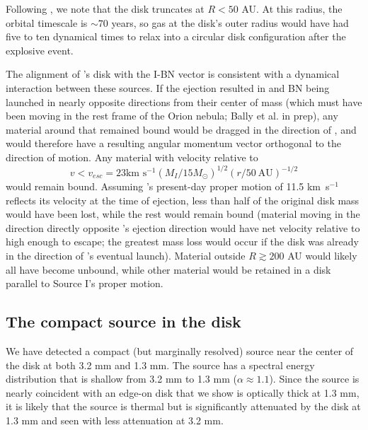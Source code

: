 \documentclass[twocolumn]{aastex61}
\newcommand{\msun}{\ensuremath{M_{\odot}}\xspace}			%
\newcommand{\kms}{\textrm{km~s}\ensuremath{^{-1}}\xspace}	%
\begin{document}
Following \citet{Bally2011a}, we note that the disk truncates at $R<50$
AU.  At this radius, the orbital timescale is $\sim70$ years, so gas at the
disk's outer radius would have had five to ten dynamical times to relax into a
circular disk configuration after the explosive event.

The alignment of \sourcei's disk with the I-BN vector is consistent with a
dynamical interaction between these sources.  If the ejection resulted in
\sourcei and BN being launched in nearly opposite directions from their center
of mass (which must have been moving in the rest frame of the Orion nebula; 
Bally et al. in prep), any material around \sourcei that remained bound would
be dragged in the direction of \sourcei, and would therefore have a resulting
angular momentum vector orthogonal to the direction of motion.  Any material
with
velocity relative to \sourcei 
$$v < v_{esc} = 23 \kms (M_I/15\msun)^{1/2}  (r/50~\mathrm{AU})^{-1/2}$$
would remain bound.
Assuming \sourcei's present-day proper motion of 11.5 \kms reflects its velocity
at the time of ejection, less than half of the original disk mass would
have been lost, while the rest would remain bound (material moving in the
direction directly opposite \sourcei's ejection direction would have net
velocity relative to \sourcei high enough to escape; the greatest mass
loss would occur if the disk was already in the direction of \sourcei's eventual
launch).
Material outside $R\gtrsim200$ AU would likely all have become unbound, while other
material would be retained in a disk parallel to Source I's proper motion.


\subsection{The compact source in the disk}
\label{sec:ptsrc}
We have detected a compact (but marginally resolved) source near the center of
the disk at both 3.2 mm and 1.3 mm.  The source has a spectral energy distribution
that is shallow from 3.2 mm to 1.3 mm ($\alpha\approx1.1$).  Since the source is nearly
coincident with an edge-on disk that we show is optically thick at 1.3 mm, it is
likely that the source is thermal but is significantly attenuated by the disk
at 1.3 mm and seen with less attenuation at 3.2 mm.
\end{document}
